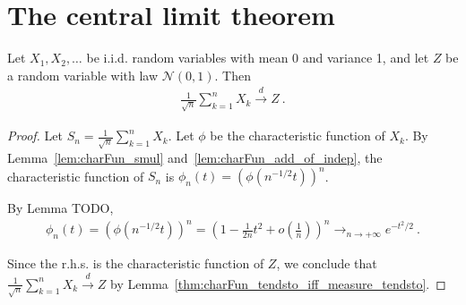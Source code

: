 \chapter{The central limit theorem}

\begin{theorem}\label{clt}
Let $X_1, X_2, \ldots$ be i.i.d. random variables with mean 0 and variance 1, and let $Z$ be a random variable with law $\mathcal N(0,1)$. Then
\begin{align*}
\frac{1}{\sqrt{n}}\sum_{k=1}^n X_k \xrightarrow{d} Z \: .
\end{align*}
\end{theorem}

\begin{proof}
Let $S_n = \frac{1}{\sqrt{n}}\sum_{k=1}^n X_k$. Let $\phi$ be the characteristic function of $X_k$. By Lemma~\ref{lem:charFun_smul} and~\ref{lem:charFun_add_of_indep}, the characteristic function of $S_n$ is $\phi_n(t) = (\phi(n^{-1/2}t))^n$.

By Lemma TODO,
\begin{align*}
\phi_n(t) = (\phi(n^{-1/2}t))^n = \left(1 - \frac{1}{2n}t^2 + o(\frac{1}{n})\right)^n \to_{n \to +\infty} e^{-t^2/2} \: .
\end{align*}

Since the r.h.s. is the characteristic function of $Z$, we conclude that $\frac{1}{\sqrt{n}}\sum_{k=1}^n X_k \xrightarrow{d} Z$ by Lemma~\ref{thm:charFun_tendsto_iff_measure_tendsto}.
\end{proof}
